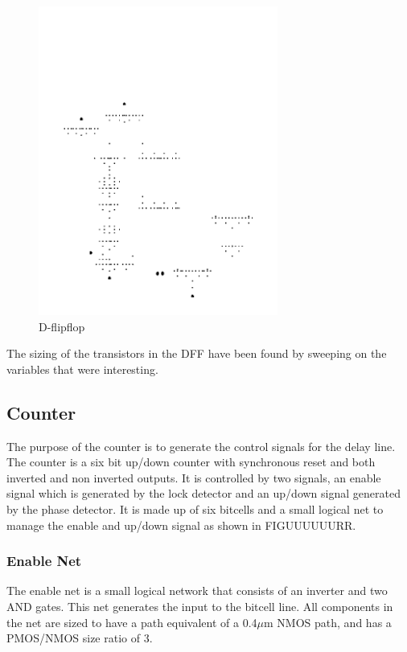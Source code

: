 \documentclass[a4paper,12pt]{article} \usepackage{graphicx}
\begin{document}
\begin{figure}[h]
\centering
\includegraphics[width=0.7\textwidth, angle = 270]{../Bilder/DFF-1.png}
\caption{D-flipflop}
\label{fig:DFF}
\end{figure}

The sizing of the transistors in the DFF have been found by sweeping on the variables that were interesting.

\subsection{Counter}
The purpose of the counter is to generate the control signals for the delay line.
The counter is a six bit up/down counter with synchronous reset and both
inverted and non inverted outputs. It is controlled by two signals, an enable
signal which is generated by the lock detector and an up/down signal generated
by the phase detector. It is made up of six bitcells and a small logical net to
manage the enable and up/down signal as shown in FIGUUUUUURR.
\subsubsection{Enable Net}
The enable net is a small logical network that consists of an inverter and two
AND gates. This net generates the input to the bitcell line.
All components in the net are sized to have a path equivalent of a 0.4$\mu$m NMOS
path, and has a PMOS/NMOS size ratio of 3.
\end{document}
